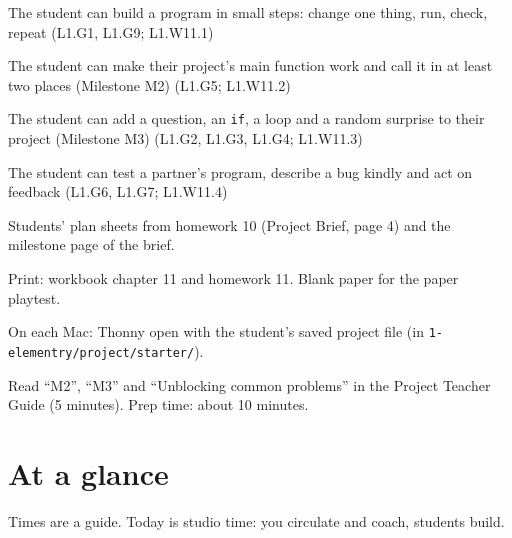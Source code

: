 
\begin{objectives}
  \item The student can build a program in small steps: change one thing, run, check, repeat (L1.G1, L1.G9; L1.W11.1)
  \item The student can make their project's main function work and call it in at least two places (Milestone M2) (L1.G5; L1.W11.2)
  \item The student can add a question, an \texttt{if}, a loop and a random surprise to their project (Milestone M3) (L1.G2, L1.G3, L1.G4; L1.W11.3)
  \item The student can test a partner's program, describe a bug kindly and act on feedback (L1.G6, L1.G7; L1.W11.4)
\end{objectives}

\begin{materials}
  \item Students' plan sheets from homework 10 (Project Brief, page 4) and the milestone page of the brief.
  \item Print: workbook chapter 11 and homework 11. Blank paper for the paper playtest.
  \item On each Mac: Thonny open with the student's saved project file (in \texttt{1-elementry/project/starter/}).
  \item Read \enquote{M2}, \enquote{M3} and \enquote{Unblocking common problems} in the Project Teacher Guide (5 minutes). Prep time: about 10 minutes.
\end{materials}

\section{At a glance}
Times are a guide. Today is studio time: you circulate and coach, students build.
\begin{timeplan}
\end{timeplan}

